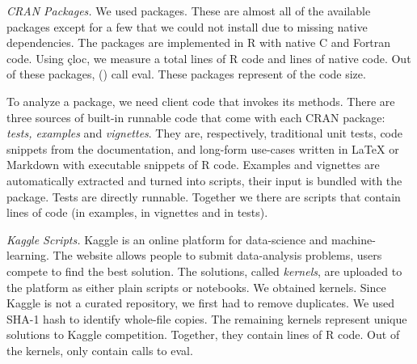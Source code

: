 \documentclass[acmsmall]{acmart}
\newcommand{\mypara}[1]{\medskip\noindent\emph{#1}\xspace}
\begin{document}


\mypara{CRAN Packages.} We used \CranAllPackages packages. These are almost all
of the available packages except for a few that we could not install due to
missing native dependencies. The packages are implemented in R with native C and
Fortran code. Using \c{cloc}, we measure a total \CranAllRCodeRnd lines of R
code and \CranAllNativeCodeRnd lines of native code. Out of these packages,
\CranPackages (\CranPackagesRatio) call eval. These packages represent
\CranCodeRatio of the code size.

To analyze a package, we need client code that invokes its methods. There are
three sources of built-in runnable code that come with each CRAN package:
\emph{tests, examples} and \emph{vignettes}. They are, respectively, traditional
unit tests, code snippets from the documentation, and long-form use-cases
written in \LaTeX\xspace or Markdown with executable snippets of R code.
Examples and vignettes are automatically extracted and turned into scripts,
their input is bundled with the package. Tests are directly runnable. Together
we there are \CranRunnableScripts scripts that contain \CranRunnableCode lines
of code (\CranRunnableCodeExamplesRnd in examples, \CranRunnableCodeVignettesRnd
in vignettes and \CranRunnableCodeTestsRnd in tests).

\mypara{Kaggle Scripts.} Kaggle is an online platform for data-science and
machine-learning. The website allows people to submit data-analysis problems,
users compete to find the best solution. The solutions, called \emph{kernels},
are uploaded to the platform as either plain scripts or notebooks. We obtained
\KaggleKernels kernels. Since Kaggle is not a curated repository, we first had
to remove duplicates. We used SHA-1 hash to identify \KaggleDuplicates
whole-file copies. The remaining \KaggleUnique kernels represent unique
solutions to \KaggleCompetitions Kaggle competition. Together, they contain
\KaggleCode lines of R code. Out of the \KaggleUniqueRnd kernels, only
\KaggleWithEvals contain calls to eval.
\end{document}

